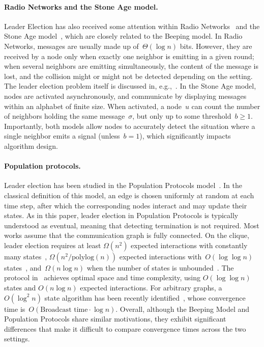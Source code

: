 \paragraph{Radio Networks and the Stone Age model.} Leader Election has also received some attention within Radio Networks~\cite{chlamtac_broadcasting_1985} and the Stone Age model~\cite{emek_stone_2013}, which are closely related to the Beeping model.
In Radio Networks, messages are usually made up of~$\Theta(\log n)$ bits. However, they are received by a node only when exactly one neighbor is emitting in a given round; when several neighbors are emitting simultaneously, the content of the message is lost, and the collision might or might not be detected depending on the setting.
The leader election problem itself is discussed in, e.g.,~\cite{chlebus_electing_2012,kowalski_leader_2009}.
In the Stone Age model, nodes are activated asynchronously, and communicate by displaying messages within an alphabet of finite size. When activated, a node~$u$ can count the number of neighbors holding the same message~$\sigma$, but only up to some threshold~$b \geq 1$.
Importantly, both models allow nodes to accurately detect the situation where a single neighbor emits a signal (unless~$b=1$), which significantly impacts algorithm design.

\paragraph{Population protocols.} 

Leader election has been studied in the Population Protocols model~\cite{AspnesR09}. In the classical definition of this model, an edge is chosen uniformly at random at each time step, after which the corresponding nodes interact and may update their states.
As in this paper, leader election in Population Protocols is typically understood as eventual, meaning that detecting termination is not required. Most works assume that the communication graph is fully connected.
On the clique, leader election requires at least $\Omega(n^2)$ expected interactions with constantly many states~\cite{DotyS18},
$\Omega(n^2/\mathrm{polylog}(n))$ expected interactions with~$O(\log \log n)$ states~\cite{AlistarhAEGR17}, and~$\Omega(n \log n)$ when the number of states is unbounded~\cite{SudoM20}. The protocol in~\cite{BerenbrinkGK20} achieves optimal space and time complexity, using $O(\log \log n)$ states and $O(n \log n)$ expected interactions.
For arbitrary graphs, a $O(\log^2 n)$ state algorithm has been recently identified~\cite{alistarh_nearoptimal_2022}, whose convergence time is~$O(\text{Broadcast time} \cdot \log n)$.
Overall, although the Beeping Model and Population Protocols share similar motivations, they exhibit significant differences that make it difficult to compare convergence times across the two settings.


